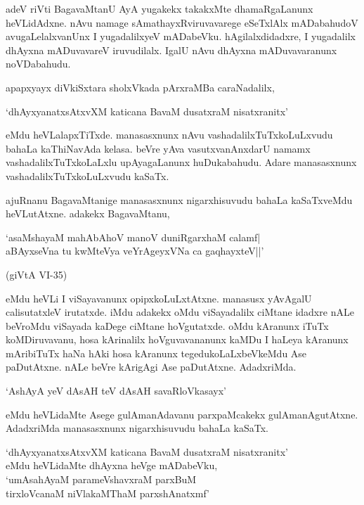 adeV riVti BagavaMtanU AyA yugakekx takakxMte dhamaRgaLanunx heVLidAdxne. nAvu namage sAmathayxRviruvavarege eSeTxlAlx mADabahudoV avugaLelalxvanUnx I yugadalilxyeV mADabeVku. hAgilalxdidadxre, I yugadalilx dhAyxna mADuvavareV iruvudilalx. IgalU nAvu dhAyxna mADuvavaranunx noVDabahudu.

apapxyayx diVkiSxtara sholxVkada pArxraMBa caraNadalilx,

\begin{shloka}
`dhAyxyanatxsAtxvXM katicana BavaM dusatxraM nisatxranitx'
\end{shloka}

\noindent eMdu heVLalapxTiTxde. manasasxnunx nAvu vashadalilxTuTxkoLuLxvudu bahaLa kaThiNavAda kelasa. beVre yAva vasutxvanAnxdarU namamx vashadalilxTuTxkoLaLxlu upAyagaLanunx huDukabahudu. Adare manasasxnunx vashadalilxTuTxkoLuLxvudu kaSaTx.

ajuRnanu BagavaMtanige manasasxnunx nigarxhisuvudu bahaLa kaSaTxveMdu heVLutAtxne. adakekx BagavaMtanu,

\begin{shloka}
`asaMshayaM mahAbAhoV manoV duniRgarxhaM calamf|\\
aBAyxseVna tu kwMteVya veYrAgeyxVNa ca gaqhayxteV||'\\
\begin{flushright}
(giVtA {\eng VI-35})
\end{flushright}
\end{shloka}

\noindent eMdu heVLi I viSayavanunx opipxkoLuLxtAtxne. manasusx yAvAgalU calisutatxleV irutatxde. iMdu adakekx oMdu viSayadalilx ciMtane idadxre nALe beVroMdu viSayada kaDege ciMtane hoVgutatxde. oMdu kAranunx iTuTx koMDiruvavanu, hosa kArinalilx hoVguvavananunx kaMDu I haLeya kAranunx mAribiTuTx haNa hAki hosa kAranunx tegedukoLaLxbeVkeMdu Ase paDutAtxne. nALe beVre kArigAgi Ase paDutAtxne. AdadxriMda.

\begin{shloka}
`AshAyA yeV dAsAH teV dAsAH savaRloVkasayx'
\end{shloka}

\noindent eMdu heVLidaMte Asege gulAmanAdavanu parxpaMcakekx gulAmanAgutAtxne. AdadxriMda manasasxnunx nigarxhisuvudu bahaLa kaSaTx.

\begin{shloka}
`dhAyxyanatxsAtxvXM katicana BavaM dusatxraM nisatxranitx'\\
eMdu heVLidaMte dhAyxna heVge mADabeVku,\\
`umAsahAyaM parameVshavxraM parxBuM\\
tirxloVcanaM niVlakaMThaM parxshAnatxmf'
\end{shloka}

